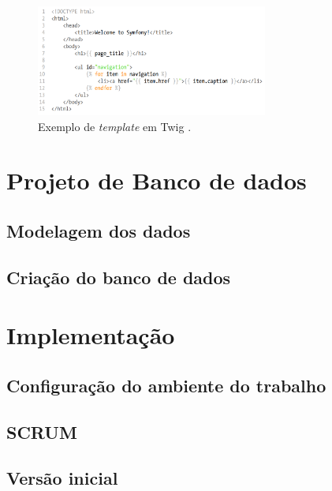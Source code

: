 \documentclass[cic,tc]{iiufrgs}
\begin{document}
\bigskip

\begin{figure}[ht]
    \caption{Exemplo de \textit{template} em Twig .}
       	\begin{center}
            \includegraphics[width=0.68\textwidth]{figuras/twig-symf.png}
        \end{center}
    \label{codeTemplateTwig}
\end{figure}


\section{Projeto de Banco de dados}
\label{metodologiaBD}

\subsection{Modelagem dos dados}
\label{BDModelagem}

\subsection{Criação do banco de dados}
\label{BDCriacao}

\section{Implementação}
\label{metodologiaImplementação}

\subsection{Configuração do ambiente do trabalho}
\label{implementacaoConfig}

\subsection{SCRUM}
\label{implementacaoSCRUM}

\subsection{Versão inicial}
\label{implementacaoIR}
\end{document}
